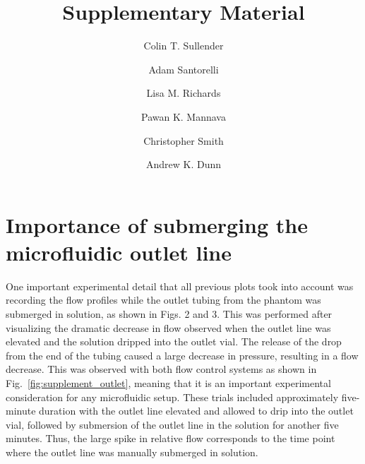 \documentclass{article}
\title{Supplementary Material}
\author[a]{Colin T. Sullender}
\author[a]{Adam Santorelli}
\author[a]{Lisa M. Richards}
\author[a]{Pawan K. Mannava}
\author[a]{Christopher Smith}
\author[a,*]{Andrew K. Dunn}
\affil[a]{Department of Biomedical Engineering, The University of Texas at Austin, Austin, TX, 78712, USA}
\date{}
\begin{document}
\maketitle

\section{Importance of submerging the microfluidic outlet line}

One important experimental detail that all previous plots took into account was recording the flow profiles while the outlet tubing from the phantom was submerged in solution, as shown in Figs. 2 and 3. This was performed after visualizing the dramatic decrease in flow observed when the outlet line was elevated and the solution dripped into the outlet vial. The release of the drop from the end of the tubing caused a large decrease in pressure, resulting in a flow decrease. This was observed with both flow control systems as shown in Fig.~\ref{fig:supplement_outlet}, meaning that it is an important experimental consideration for any microfluidic setup. These trials included approximately five-minute duration with the outlet line elevated and allowed to drip into the outlet vial, followed by submersion of the outlet line in the solution for another five minutes. Thus, the large spike in relative flow corresponds to the time point where the outlet line was manually submerged in solution.
\end{document}
